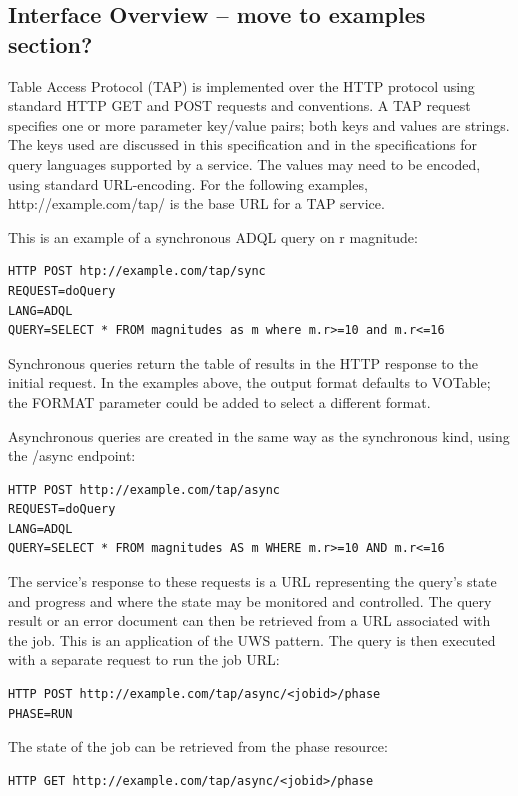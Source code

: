 \documentclass[11pt,a4paper]{ivoa}
\begin{document}
\subsection{Interface Overview -- move to examples section?}
Table Access Protocol (TAP) is implemented over the HTTP protocol using standard 
HTTP GET and POST requests and conventions. A TAP request specifies one or more 
parameter key/value pairs; both keys and values are strings. The keys used are 
discussed in this specification and in the specifications for query languages 
supported by a service. The values may need to be encoded, using standard 
URL-encoding. For the following examples, http://example.com/tap/ is the base 
URL for a TAP service.

This is an example of a synchronous ADQL query on r magnitude:

\begin{verbatim}
HTTP POST htp://example.com/tap/sync
REQUEST=doQuery
LANG=ADQL
QUERY=SELECT * FROM magnitudes as m where m.r>=10 and m.r<=16
\end{verbatim}

Synchronous queries return the table of results in the HTTP response to the 
initial request. In the examples above, the output format defaults to VOTable; 
the FORMAT parameter could be added to select a different format.

Asynchronous queries are created in the same way as the synchronous kind, using 
the /async endpoint:

\begin{verbatim}
HTTP POST http://example.com/tap/async
REQUEST=doQuery
LANG=ADQL
QUERY=SELECT * FROM magnitudes AS m WHERE m.r>=10 AND m.r<=16
\end{verbatim}

The service's response to these requests is a URL representing the query's 
state and progress and where the state may be monitored and controlled. The 
query 
result or an error document can then be retrieved from a URL associated with the 
job. This is an application of the UWS pattern. The query is then executed 
with a separate request to run the job URL:

\begin{verbatim}
HTTP POST http://example.com/tap/async/<jobid>/phase
PHASE=RUN
\end{verbatim}

The state of the job can be retrieved from the phase resource:

\begin{verbatim}
HTTP GET http://example.com/tap/async/<jobid>/phase
\end{verbatim}
\end{document}
